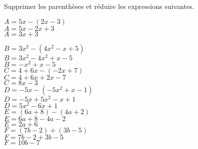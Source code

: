 \begin{corrige}
    Supprimer les parenthèses et réduire les expressions suivantes.    
    \begin{itemize}
        \def\item{}
        \begin{spacing}{1.2}
            \item $A= 5x-(2x-3)$\\
            {\red $A=5x-2x+3$\\$A=3x+3$}
        \end{spacing}
    \end{itemize}
    \Coupe
    \begin{itemize}
        \def\item{}
        \begin{spacing}{1.2}
            \item $B= 3x^2-(4x^2-x+5)$\\
            {\red $B=3x^2-4x^2+x-5$\\$B=-x^2+x-5$\\}
            \item $C= 4+6x-(-2x+7)$\\
            {\red $C=4+6x+2x-7$\\$C=8x-3$}\\
            \columnbreak
            \item $D= -5x-(-5x^2+x-1)$\\
            {\red $D=-5x+5x^2-x+1$\\$D=5x^2-6x+1$}\\
            \item $E= (6a+8)-(4a+2)$\\
            {\red $E=6a+8-4a-2$\\$E=2a+6$}\\
            \item $F= (7b-2)+(3b-5)$\\
            {\red $F=7b-2+3b-5$\\$F=10b-7$}\\
        \end{spacing}
    \end{itemize}    
\end{corrige}

